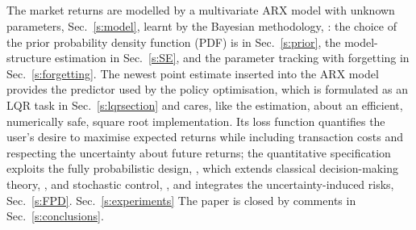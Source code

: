 \subsection*{}
The market returns are modelled by a multivariate ARX model with unknown parameters, Sec.\ \ref{s:model}, learnt by the Bayesian methodology, \cite{Pet:81,Bretthorst1990}: the choice of the prior probability density function (PDF) is in Sec.\ \ref{s:prior}, the model-structure estimation in Sec.\ \ref{s:SE}, and the parameter tracking with forgetting in Sec.\ \ref{s:forgetting}. The newest point estimate inserted into the ARX model provides the predictor used by the policy optimisation, which is formulated as an LQR task in Sec.\ \ref{s:lqrsection} and cares, like the estimation, about an efficient, numerically safe, square root implementation. Its loss function quantifies the user's desire to maximise expected returns while including transaction costs and respecting the uncertainty about future returns; the quantitative specification exploits the fully probabilistic design, \cite{karny2022fully}, which extends classical decision-making theory, \cite{Deg:70,FeiShw:02}, and stochastic control, \cite{Ber:17}, and integrates the uncertainty-induced risks, Sec.\ \ref{s:FPD}. Sec.\ \ref{s:experiments}  The paper is closed by comments in Sec.\ \ref{s:conclusions}.
